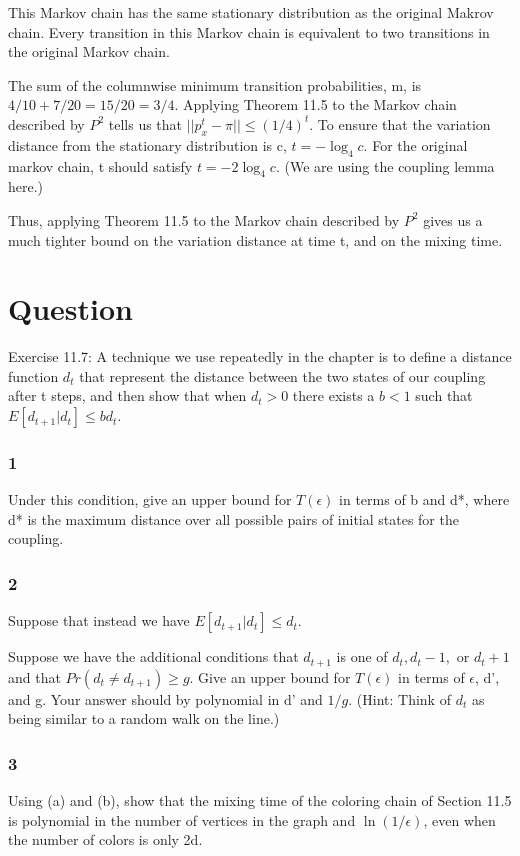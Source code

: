 \documentclass[10pt]{amsart}
\theoremstyle{remark}
\begin{document}
This Markov chain has the same stationary distribution as the original Makrov chain. Every transition in this Markov chain is equivalent to two transitions in the original Markov chain.

The sum of the columnwise minimum transition probabilities, m, is $4/10+7/20=15/20=3/4$. Applying Theorem 11.5 to the Markov chain described by $P^{2}$ tells us that $||p_{x}^{t}-\pi|| \leq (1/4)^{t}$. To ensure that the variation distance from the stationary distribution is c, $t = -\log_{4}c$. For the original markov chain, t should satisfy $t = -2\log_{4}c$. (We are using the coupling lemma here.)

Thus, applying Theorem 11.5 to the Markov chain described by $P^{2}$ gives us a much tighter bound on the variation distance at time t, and on the mixing time.

\section{Question}
Exercise 11.7: A technique we use repeatedly in the chapter is to define a distance function $d_{t}$ that represent the distance between the two states of our coupling after t steps, and then show that when $d_{t}>0$ there exists a $b<1$ such that
$E[d_{t+1}|d_{t}]\leq bd_{t}$.

\subsubsection{1} Under this condition, give an upper bound for $T(\epsilon)$ in terms of b and d*, where d* is the maximum distance over all possible pairs of initial states for the coupling.

\subsubsection{2} Suppose that instead we have
$E[d_{t+1}|d_{t}]\leq d_{t}$.

Suppose we have the additional conditions that $d_{t+1}$ is one of $d_{t}, d_{t}-1,$ or $d_{t}+1$ and that $Pr(d_{t} \neq d_{t+1})\geq g$. Give an upper bound for $T(\epsilon)$ in terms of $\epsilon$, d', and g. Your answer should by polynomial in d' and $1/g$. (Hint: Think of $d_{t}$ as being similar to a random walk on the line.)

\subsubsection{3} Using (a) and (b), show that the mixing time of the coloring chain of Section 11.5 is polynomial in the number of vertices in the graph and $\ln(1/\epsilon)$, even when the number of colors is only 2d.
\end{document}
